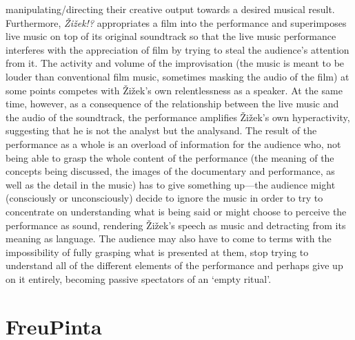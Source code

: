 manipulating/directing their creative output towards a desired musical result. Furthermore, \emph{\v{Z}i\v{z}ek!?} appropriates a film into the performance and superimposes live music on top of its original soundtrack so that the live music performance interferes with the appreciation of film by trying to steal the audience's attention from it. The activity and volume of the improvisation (the music is meant to be louder than conventional film music, sometimes masking the audio of the film) at some points competes with \v{Z}i\v{z}ek's own relentlessness as a speaker. At the same time, however, as a consequence of the relationship between the live music and the audio of the soundtrack, the performance amplifies \v{Z}i\v{z}ek's own hyperactivity, suggesting that he is not the analyst but the analysand. The result of the performance as a whole is an overload of information for the audience who, not being able to grasp the whole content of the performance (the meaning of the concepts being discussed, the images of the documentary and performance, as well as the detail in the music) has to give something up---the audience might (consciously or unconsciously) decide to ignore the music in order to try to concentrate on understanding what is being said or might choose to perceive the performance as sound, rendering \v{Z}i\v{z}ek's speech as music and detracting from its meaning as language. The audience may also have to come to terms with the impossibility of fully grasping what is presented at them, stop trying to understand all of the different elements of the performance and perhaps give up on it entirely, becoming passive spectators of an `empty ritual'.

\section{FreuPinta}

